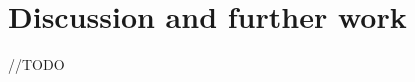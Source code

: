 \documentclass[11pt]{article}
\begin{document}
\section{Discussion and further work}

//TODO
\end{document}
